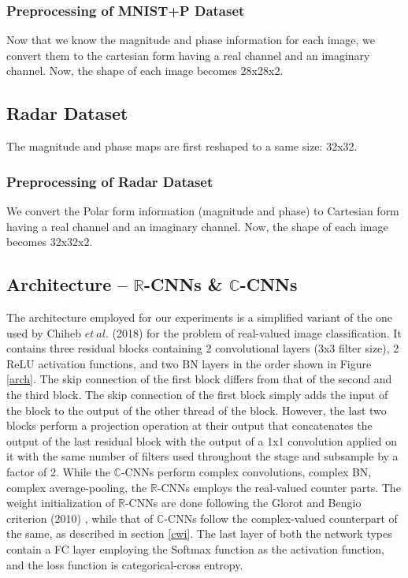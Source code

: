  
 \subsubsection{Preprocessing of MNIST+P Dataset}
 Now that we know the magnitude and phase information for each image, we convert them to the cartesian form having a real channel and an imaginary channel. Now, the shape of each image becomes 28x28x2.
 
     
 \subsection{Radar Dataset}
 The magnitude and phase maps are first reshaped to a same size: 32x32. 
 
 
 
 
 \subsubsection{Preprocessing of Radar Dataset}
 We convert the Polar form information (magnitude and phase) to Cartesian form having a real channel and an imaginary channel. Now, the shape of each image becomes 32x32x2.
 
 
 
 \subsection{Architecture -- $\mathbb{R}$-CNNs \& $\mathbb{C}$-CNNs}
 The architecture employed for our experiments is a simplified variant of the one used by Chiheb $et \ al.$ (2018) \cite{trabelsi2018deep} for the problem of real-valued image classification. It contains three residual blocks containing 2 convolutional layers (3x3 filter size), 2 ReLU activation functions, and two BN layers in the order shown in Figure \ref{arch}. The skip connection of the first block differs from that of the second and the third block. The skip connection of the first block simply adds the input of the block to the output of the other thread of the block. However, the last two blocks perform a projection operation at their output that concatenates the output of the last residual block with the output of a 1x1 convolution applied on it with the same number of filters used throughout the stage and subsample by a factor of 2. While the $\mathbb{C}$-CNNs perform complex convolutions, complex BN, complex average-pooling, the $\mathbb{R}$-CNNs employs the real-valued counter parts. The weight initialization of $\mathbb{R}$-CNNs are done following the Glorot and Bengio criterion (2010) \cite{glorot2010understanding}, while that of $\mathbb{C}$-CNNs follow the complex-valued counterpart of the same, as described in section \ref{cwi}. The last layer of both the network types contain a FC layer employing the Softmax function as the activation function, and the loss function is categorical-cross entropy.
 
 
 
 
 
 
 
 
 
 
 
 